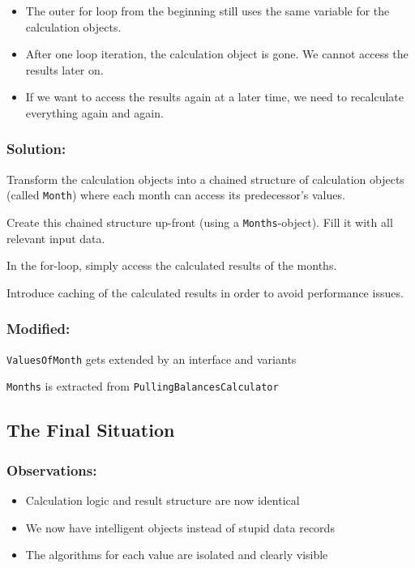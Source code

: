 \documentclass[a4paper,fleqn,titlepage,11pt]{article}
\begin{document}
\begin{itemize}
\item The outer for loop from the beginning still uses the same variable for the calculation objects.
\item After one loop iteration, the calculation object is gone. We cannot access the results later on.
\item If we want to access the results again at a later time, we need to recalculate everything again and again.
\end{itemize}

\subsubsection*{Solution:}

Transform the calculation objects into a chained structure of calculation objects (called \texttt{Month}) where each month can access its predecessor's values.

Create this chained structure up-front (using a \texttt{Months}-object). Fill it with all relevant input data.

In the for-loop, simply access the calculated results of the months.

Introduce caching of the calculated results in order to avoid performance issues.

\subsubsection*{Modified:}

\texttt{ValuesOfMonth} gets extended by an interface and variants

\texttt{Months} is extracted from \texttt{PullingBalancesCalculator}

\subsection*{The Final Situation}

\subsubsection*{Observations:}

\begin{itemize}
\item Calculation logic and result structure are now identical
\item We now have intelligent objects instead of stupid data records
\item The algorithms for each value are isolated and clearly visible
\end{itemize}
\end{document}
